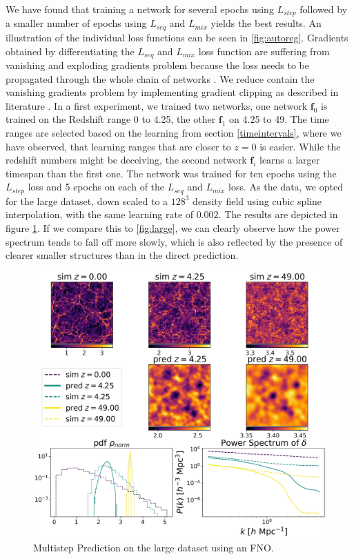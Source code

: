 \documentclass{article}
\begin{document}
We have found that training a network for several epochs using $L_{step}$ followed by a smaller number of epochs using $L_{seq}$ and $L_{mix}$ yields the best results. An illustration of the individual loss functions can be seen in \ref{fig:autoreg}. Gradients obtained by differentiating the $L_{seq}$ and $L_{mix}$ loss function are suffering from vanishing and exploding gradients problem because the loss needs to be propagated through the whole chain of networks \citep{thuerey2021physics}. We reduce contain the vanishing gradients problem by implementing gradient clipping as described in literature \citep{zhang2019gradient}. In a first experiment, we trained two networks, one network $\mathbf{f}_0$ is trained on the Redshift range 0 to 4.25, the other  $\mathbf{f}_1$ on 4.25 to 49. The time ranges are selected based on the learning from section \ref{timeintervals}, where we have observed, that learning ranges that are closer to $z=0$ is easier. While the redshift numbers might be deceiving, the second network  $\mathbf{f}_i$ learns a larger timespan than the first one. The network was trained for ten epochs using the $L_{step}$ loss and 5 epochs on each of the $L_{seq}$ and $L_{mix}$ loss. As the data, we opted for the large dataset, down scaled to a $128^3$ density field using cubic spline interpolation, with the same learning rate of $0.002$. The results are depicted in figure \ref{fig:multistep}. If we compare this to \ref{fig:large}, we can clearly observe how the power spectrum tends to fall off more slowly, which is also reflected by the presence of clearer smaller structures than in the direct prediction. 

\begin{figure}[h]
    \centering
    \includegraphics[width=0.8\linewidth]{img/prediction_sequential_two.jpg}
    \caption{Multistep Prediction on the large dataset using an FNO.}
    \label{fig:multistep}
\end{figure}
\end{document}
